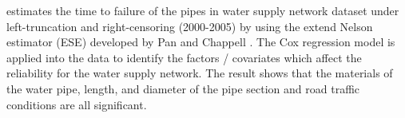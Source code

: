 \documentclass[12pt,letterpaper]{article}
\begin{document}
\citet{carrion2010} estimates the time to failure of the pipes in water supply network dataset under left-truncation and right-censoring (2000-2005) by using the extend Nelson estimator (ESE) developed by Pan and Chappell \citeyearpar{pan1998}. The Cox regression model is applied into the data to identify the factors / covariates which affect the reliability for the water supply network. The result shows that the materials of the water pipe, length, and diameter of the pipe section and road traffic conditions are all significant. %
\end{document}
